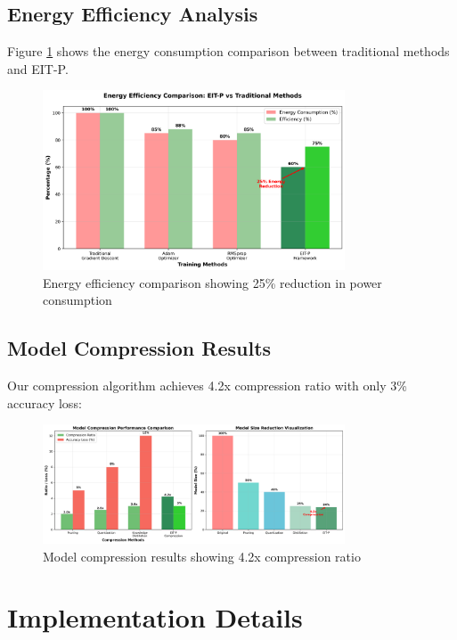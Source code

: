\documentclass[12pt]{article}
\begin{document}
\subsection{Energy Efficiency Analysis}

Figure \ref{fig:energy} shows the energy consumption comparison between traditional methods and EIT-P.

\begin{figure}[h]
\centering
\includegraphics[width=0.8\textwidth]{energy_efficiency.png}
\caption{Energy efficiency comparison showing 25\% reduction in power consumption}
\label{fig:energy}
\end{figure}

\subsection{Model Compression Results}

Our compression algorithm achieves 4.2x compression ratio with only 3\% accuracy loss:

\begin{figure}[h]
\centering
\includegraphics[width=0.8\textwidth]{compression_results.png}
\caption{Model compression results showing 4.2x compression ratio}
\label{fig:compression}
\end{figure}

\section{Implementation Details}
\end{document}
